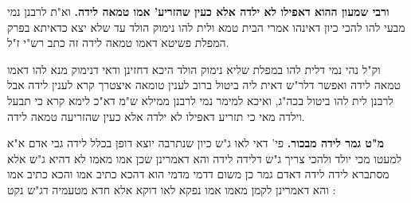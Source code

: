 \documentclass[12pt, openany]{book}
\newcommand{\sethebfont}{
\fontsize{10.5pt}{21.0pt} \selectfont
}
\newcommand{\twocol}[1]{
	{\sethebfont \begin{multicols}{2}
			#1
	\end{multicols}}	
}
\begin{document}
\twocol{\textbf{ורבי שמעון ההוא דאפילו לא ילדה אלא כעין שהזריע' אמו טמאה לידה.}  וא"ת לרבנן נמי מבעי להו להכי כיון דאינהו אמרי הבית טמא ולית להו נימוק הולד עד שלא יצא כדאיתא בפרק המפלת פשיטא דאמו טמאה לידה זה כתב רש"י ז"ל.\par  וק"ל נהי נמי דלית להו במפלת שליא נימוק הולד היכא דחזינן ודאי דנימוק מנא להו דאמו טמאה לידה ואפשר דלר"ש דאית ליה ביטול ברוב לענין טומאה איצטרך קרא לענין לידה אבל לרבנן לית להו ביטול בכה"ג, ואיכא למימר נמי לרבנן ממילא ש"מ דא"כ לימא קרא כי תבעל וילדה מאי כי תזריע דאפילו לא ילדה אלא כעין שהזריעה טמאה לידה. 
\par\textbf{מ"ט גמר לידה מבכור.}  פי' דאי לאו ג"ש כיון שנתרבה יוצא דופן בכלל לידה גבי אדם א"א למעטו מכי יולד ולהכי צריך ג"ש דלידה לידה והא דאמרינן שכן אמו מאמו לא דהיא ג"ש אלא מסתברא לידה לידה דאדם גמר כן משום דדמי מדמי הוא דהכא כתיב אמו והכא כתיב אמו והא דאמרינן לקמן מאמו אמו נפקא לאו דוקא אלא חדא מטעמיה דג"ש נקט : 
}
\end{document}
